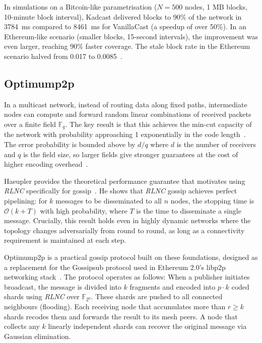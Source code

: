 \documentclass{article}
\begin{document}
In simulations on a Bitcoin-like parametrisation ($N = 500$ nodes, 1 MB blocks, 10-minute block interval), Kadcast delivered blocks to 90\% of the network in \qty{3784}{\milli\second} compared to \qty{8461}{\milli\second} for VanillaCast (a speedup of over 50\%). In an Ethereum-like scenario (smaller blocks, 15-second intervals), the improvement was even larger, reaching 90\% faster coverage. The stale block rate in the Ethereum scenario halved from 0.017 to 0.0085~\cite{rohrerKadcastStructuredApproach2019}.


\subsection{Optimump2p}
In a multicast network, instead of routing data along fixed paths, intermediate nodes can compute and forward random linear combinations of received packets over a finite field $\mathbb{F}_q$. The key result is that this achieves the min-cut capacity of the network with probability approaching 1 exponentially in the code length~\cite{hoRandomLinearNetwork2006}. The error probability is bounded above by $d/q$ where $d$ is the number of receivers and $q$ is the field size, so larger fields give stronger guarantees at the cost of higher encoding overhead~\cite{hoRandomLinearNetwork2006}.

Haeupler provides the theoretical performance guarantee that motivates using \textit{RLNC} specifically for gossip~\cite{haeuplerAnalyzingNetworkCoding2010}. He shows that \textit{RLNC} gossip achieves perfect pipelining: for $k$ messages to be disseminated to all $n$ nodes, the stopping time is $\mathcal{O}{(k + T)}$ with high probability, where $T$ is the time to disseminate a single message. Crucially, this result holds even in highly dynamic networks where the topology changes adversarially from round to round, as long as a connectivity requirement is maintained at each step.

Optimump2p is a practical gossip protocol built on these foundations, designed as a replacement for the Gossipsub protocol used in Ethereum 2.0's libp2p networking stack~\cite{nicolaouOptimump2pFastReliable2025}. The protocol operates as follows: When a publisher initiates broadcast, the message is divided into $k$ fragments and encoded into $p\cdot k$ coded shards using \textit{RLNC} over $\mathbb{F}_{2^q}$. These shards are pushed to all connected neighbours (flooding). Each receiving node that accumulates more than $r\geq k$ shards recodes them and forwards the result to its mesh peers. A node that collects any $k$ linearly independent shards can recover the original message via Gaussian elimination.
\end{document}
